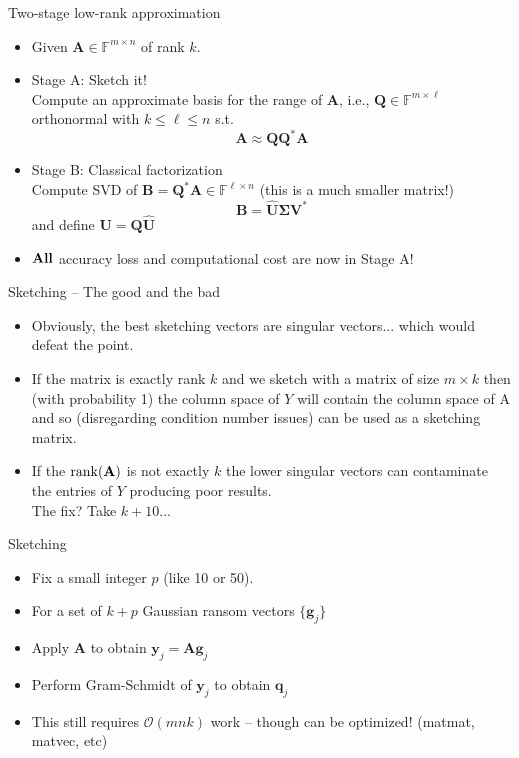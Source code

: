\documentclass{beamer}
\newcommand{\bgk}[1]{\boldsymbol{#1}}
\newcommand{\bSigma}{\bgk{\Sigma}}
\newcommand{\bvec}[1]{\mathbf{#1}}
\newcommand{\vg}{\bvec{g}}
\newcommand{\vq}{\bvec{q}}
\newcommand{\vy}{\bvec{y}}
\newcommand{\vA}{\bvec{A}}
\newcommand{\vB}{\bvec{B}}
\newcommand{\vQ}{\bvec{Q}}
\newcommand{\vU}{\bvec{U}}
\newcommand{\vV}{\bvec{V}}
\newcommand{\bitem}{\item[$\bullet$]}
\begin{document}
\begin{frame}{Two-stage low-rank approximation}

\begin{itemize}
    \bitem Given $\vA \in \mathbb{F}^{m \times n}$ of rank $k$.
    \bitem Stage A: Sketch it! \\
    Compute an approximate basis for the range of $\vA$, i.e., $\vQ \in \mathbb{F}^{m \times \ell}$ orthonormal with $k \leq \ell \leq n$ s.t.
    $$
    \vA \approx \vQ \vQ^*\vA
    $$
    \bitem Stage B: Classical factorization\\
    Compute SVD of $\vB = \vQ^* \vA \in \mathbb{F}^{\ell \times n}$ (this is a much smaller matrix!)\\
    $$
    \vB = \hat{\vU} \bSigma \vV^*
    $$
    and define $\vU = \vQ  \hat{\vU}$
    \bitem $\bf{All}$ accuracy loss and computational cost are now in Stage A!
\end{itemize}
    
\end{frame}



\begin{frame}{Sketching -- The good and the bad}
    \begin{itemize}
        \bitem Obviously, the best sketching vectors are singular vectors... which would defeat the point.
        \bitem If the matrix is exactly rank $k$ and we sketch with a matrix of size $m \times k$ then (with probability 1) the column space of $Y$ will contain the column space of A and so (disregarding condition number issues) can be used as a sketching matrix.
        \bitem If the ${\rm rank}(\vA)$ is not exactly $k$ the lower singular vectors can contaminate the entries of $Y$ producing poor results.\\ 
        The fix? Take $k + 10$...
    \end{itemize}
\end{frame}

\begin{frame}{Sketching}
\begin{itemize}
    \bitem Fix a small integer $p$ (like 10 or 50).
    \bitem For a set of $k+p$ Gaussian ransom vectors $\{\vg_j\}$
    \bitem Apply $\vA$ to obtain $\vy_j = \vA \vg_j$
    \bitem Perform Gram-Schmidt of $\vy_j$ to obtain $\vq_j$
    \bitem This still requires $\mathcal{O} (mnk)$ work -- though can be optimized! (matmat, matvec, etc)
\end{itemize}
\end{frame}
\end{document}
